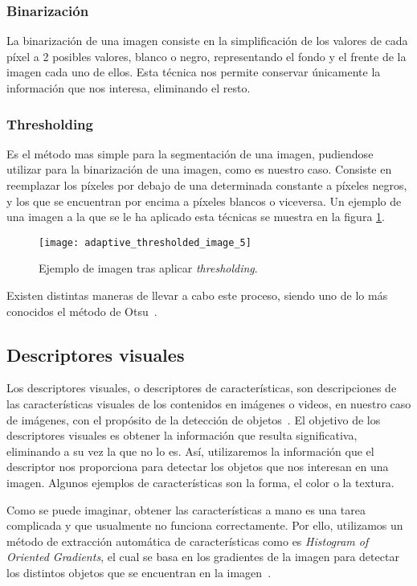 \subsubsection{Binarización}

La binarización de una imagen consiste en la simplificación de los valores de cada píxel a 2 posibles valores, blanco o negro, representando el fondo y el frente de la imagen cada uno de ellos. Esta técnica nos permite conservar únicamente la información que nos interesa, eliminando el resto.

\subsubsection{Thresholding}

Es el método mas simple para la segmentación de una imagen, pudiendose utilizar para la binarización de una imagen, como es nuestro caso. Consiste en reemplazar los píxeles por debajo de una determinada constante a píxeles negros, y los que se encuentran por encima a píxeles blancos o viceversa. Un ejemplo de una imagen a la que se le ha aplicado esta técnicas se muestra en la figura \ref{fig:3.2.1}.

\begin{figure}[h]
\centering
\texttt{[image: adaptive\_thresholded\_image\_5]}
\caption{Ejemplo de imagen tras aplicar \textit{thresholding}.}
\label{fig:3.2.1}
\end{figure}

Existen distintas maneras de llevar a cabo este proceso, siendo uno de lo más conocidos el método de Otsu~\cite{wiki:otsu}.

\subsection{Descriptores visuales}

Los descriptores visuales, o descriptores de características, son descripciones de las características visuales de los contenidos en imágenes o videos, en nuestro caso de imágenes, con el propósito de la detección de objetos~\cite{wiki:visualdescriptor}. El objetivo de los descriptores visuales es obtener la información que resulta significativa, eliminando a su vez la que no lo es. Así, utilizaremos la información que el descriptor nos proporciona para detectar los objetos que nos interesan en una imagen. Algunos ejemplos de características son la forma, el color o la textura.

Como se puede imaginar, obtener las características a mano es una tarea complicada y que usualmente no funciona correctamente. Por ello, utilizamos un método de extracción automática de características como es \textit{Histogram of Oriented Gradients}, el cual se basa en los gradientes de la imagen para detectar los distintos objetos que se encuentran en la imagen~\cite{wiki:hog}.

